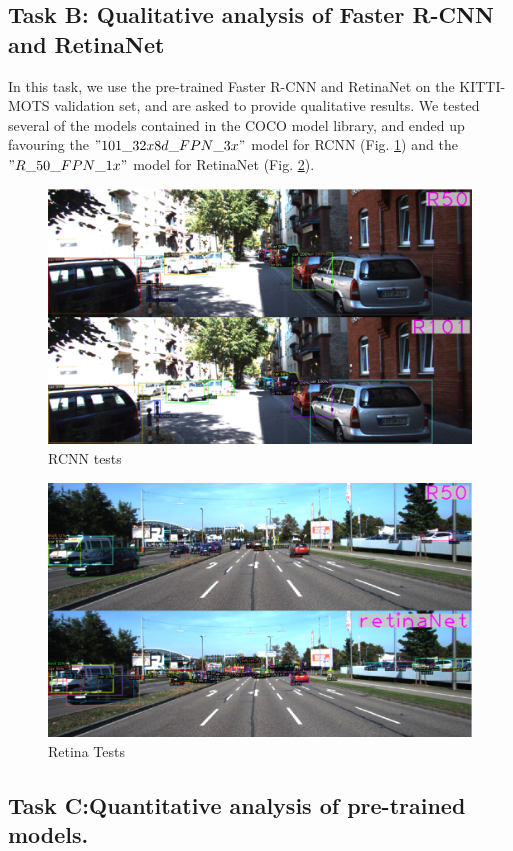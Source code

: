 \documentclass[12pt,a4paper,twocolumn,twoside]{article}
\begin{document}
\subsection{Task B: Qualitative analysis of Faster R-CNN and RetinaNet}

In this task, we use the pre-trained Faster R-CNN and RetinaNet on the
KITTI-MOTS validation set, and are asked to provide qualitative results.
We tested several of the models contained in the COCO model library, and 
ended up favouring the $"101\_32x8d\_FPN\_3x"$ model for 
RCNN (Fig. \ref{fig:r50r101}) and the $"R\_50\_FPN\_1x"$
model for RetinaNet (Fig. \ref{fig:r50retina}).

\begin{figure}[ht]
    \centering
    \includegraphics[width=0.8\linewidth]{Resources/Images/r50r101.png}
    \caption{RCNN tests}
    \label{fig:r50r101}
    \end{figure}

\begin{figure}[ht]
    \centering
    \includegraphics[width=0.8\linewidth]{Resources/Images/r50retina.png}
    \caption{Retina Tests}
    \label{fig:r50retina}
    \end{figure}

\subsection{Task C:Quantitative analysis of pre-trained models.}
\end{document}
